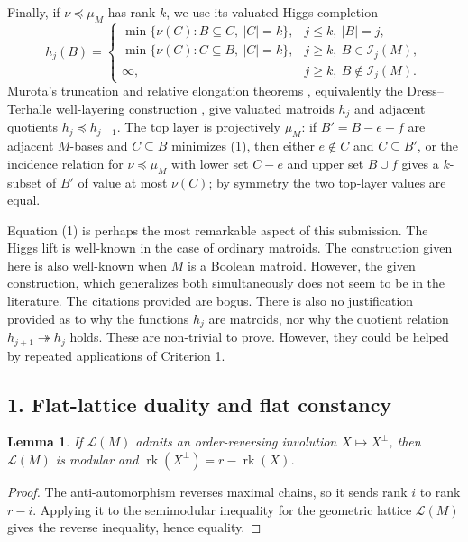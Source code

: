 \documentclass[12pt]{article}
\newcommand{\cL}{\mathcal L}
\newcommand{\rk}{\operatorname{rk}}
\newtheorem{lemma}{Lemma}
\newcommand{\review}[1]{\begin{reviewbox}#1\end{reviewbox}}
\begin{document}
Finally, if $\nu\preceq\mu_M$ has rank $k$, we use its valuated Higgs
completion
\[
 h_j(B)=
 \begin{cases}
 \min\{\nu(C): B\subseteq C,\ |C|=k\}, & j\le k,\ |B|=j,\\
 \min\{\nu(C): C\subseteq B,\ |C|=k\}, & j\ge k,\ B\in\mathcal I_j(M),\\
 \infty, & j\ge k,\ B\notin\mathcal I_j(M).
 \end{cases}                                                \tag{1}
\]
Murota's truncation and relative elongation theorems \cite[Theorems 2.1 and 4.1]{Murota}, equivalently the
Dress--Terhalle well-layering construction \cite{DT}, give valuated matroids
$h_j$ and adjacent quotients $h_j\preceq h_{j+1}$.  The top layer is
projectively $\mu_M$: if $B'=B-e+f$ are adjacent $M$-bases and
$C\subseteq B$ minimizes (1), then either $e\notin C$ and $C\subseteq B'$,
or the incidence relation for $\nu\preceq\mu_M$ with lower set $C-e$ and
upper set $B\cup f$ gives a $k$-subset of $B'$ of value at most
$\nu(C)$; by symmetry the two top-layer values are equal.

\review{
Equation (1) is perhaps the most remarkable aspect of this submission. The Higgs lift is well-known in the case of ordinary matroids. The construction given here is also well-known when $M$ is a Boolean matroid. However, the given construction, which generalizes both simultaneously does not seem to be in the literature. The citations provided are bogus. There is also no justification provided as to why the functions $h_j$ are matroids, nor why the quotient relation $h_{j+1} \twoheadrightarrow h_j$ holds. These are non-trivial to prove. However, they could be helped by repeated applications of Criterion 1.
}

\subsection*{1. Flat-lattice duality and flat constancy}

\begin{lemma}\label{lem:modular}
If $\cL(M)$ admits an order-reversing involution $X\mapsto X^\perp$,
then $\cL(M)$ is modular and $\rk(X^\perp)=r-\rk(X)$.
\end{lemma}

\begin{proof}
The anti-automorphism reverses maximal chains, so it sends rank $i$ to
rank $r-i$.  Applying it to the semimodular inequality for the geometric
lattice $\cL(M)$ gives the reverse inequality, hence equality.
\end{proof}
\end{document}
